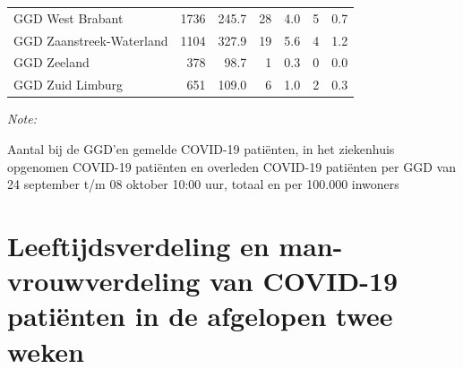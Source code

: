 \documentclass[
  english,
  man,floatsintext]{apa6}
\begin{document}
\begin{table}[H]
\begin{threeparttable}
\begin{tabular}{lrrrrrr}
GGD West Brabant & 1736 & 245.7 & 28 & 4.0 & 5 & 0.7\\
GGD Zaanstreek-Waterland & 1104 & 327.9 & 19 & 5.6 & 4 & 1.2\\
GGD Zeeland & 378 & 98.7 & 1 & 0.3 & 0 & 0.0\\
GGD Zuid Limburg & 651 & 109.0 & 6 & 1.0 & 2 & 0.3\\
\bottomrule
\end{tabular}
\begin{tablenotes}
\item \textit{Note: } 
\item Aantal bij de GGD’en gemelde COVID-19 patiënten, in het ziekenhuis opgenomen COVID-19 patiënten en overleden COVID-19 patiënten per GGD van 24 september t/m 08 oktober 10:00 uur, totaal en per 100.000 inwoners
\end{tablenotes}
\end{threeparttable}
\endgroup{}
\end{table}

\newpage

\hypertarget{leeftijdsverdeling-en-man-vrouwverdeling-van-covid-19-patiuxebnten-in-de-afgelopen-twee-weken}{%
\section{Leeftijdsverdeling en man-vrouwverdeling van COVID-19 patiënten in de afgelopen twee weken}\label{leeftijdsverdeling-en-man-vrouwverdeling-van-covid-19-patiuxebnten-in-de-afgelopen-twee-weken}}
\end{document}
